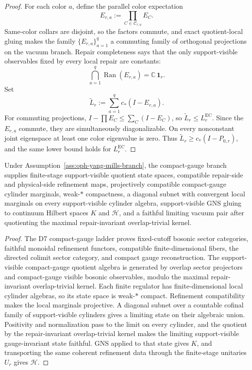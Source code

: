 \begin{proof}
For each color \(a\), define the parallel color expectation
\[
E_{r,a}:=\prod_{C\in\mathcal C_{r,a}}E_C.
\]
Same-color collars are disjoint, so the factors commute, and exact quotient-local gluing makes
the family \(\{E_{r,a}\}_{a=1}^q\) a commuting family of orthogonal projections on the vacuum
branch. Repair completeness says that the only support-visible observables fixed by every local
repair are constants:
\[
\bigcap_{a=1}^{q}\operatorname{Ran}(E_{r,a})=\mathbb C\,\mathbf 1_r.
\]
Set
\[
\widetilde L_r:=\sum_{a=1}^{q} c_*(I-E_{r,a}).
\]
For commuting projections, \(I-\prod E_C\le\sum_C(I-E_C)\), so
\(\widetilde L_r\le L_r^{\mathrm{EC}}\). Since the \(E_{r,a}\) commute, they are simultaneously
diagonalizable. On every nonconstant joint eigenspace at least one color eigenvalue is zero.
Thus \(\widetilde L_r\ge c_*(I-P_{0,r})\), and the same lower bound holds for
\(L_r^{\mathrm{EC}}\).
\end{proof}

\begin{proposition}
\label{prop:compact-gauge-extraction-yang-mills}
Under Assumption~\ref{ass:oph-yang-mills-branch}, the compact-gauge branch supplies finite-stage
support-visible quotient state spaces, compatible repair-side and physical-side refinement maps,
projectively compatible compact-gauge cylinder marginals, weak-\(*\) compactness, a diagonal
subnet with convergent local marginals on every support-visible cylinder algebra, support-visible
GNS gluing to continuum Hilbert spaces \(K\) and \(\mathcal H\), and a faithful limiting vacuum
pair after quotienting the maximal repair-invariant overlap-trivial kernel.
\end{proposition}

\begin{proof}
The D7 compact-gauge ladder proves fixed-cutoff bosonic sector categories, faithful monoidal
refinement functors, compatible finite-dimensional fibers, the directed colimit sector category,
and compact gauge reconstruction. The support-visible compact-gauge quotient algebra is generated
by overlap sector projectors and compact-gauge visible bosonic observables, modulo the maximal
repair-invariant overlap-trivial kernel. Each finite regulator has finite-dimensional local
cylinder algebras, so its state space is weak-\(*\) compact. Refinement compatibility makes the
local marginals projective. A diagonal subnet over a countable cofinal family of support-visible
cylinders gives a limiting state on their algebraic union. Positivity and normalization pass to
the limit on every cylinder, and the quotient by the repair-invariant overlap-trivial kernel makes
the limiting support-visible gauge-invariant state faithful. GNS applied to that state gives
\(K\), and transporting the same coherent refinement data through the finite-stage unitaries
\(U_r\) gives \(\mathcal H\).
\end{proof}

